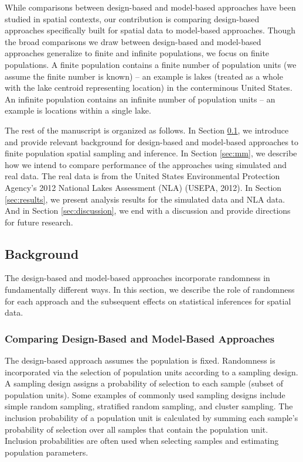 \documentclass[]{elsarticle} %
\begin{document}
While comparisons between design-based and model-based approaches have
been studied in spatial contexts, our contribution is comparing
design-based approaches specifically built for spatial data to
model-based approaches. Though the broad comparisons we draw between
design-based and model-based approaches generalize to finite and
infinite populations, we focus on finite populations. A finite
population contains a finite number of population units (we assume the
finite number is known) -- an example is lakes (treated as a whole with
the lake centroid representing location) in the conterminous United
States. An infinite population contains an infinite number of population
units -- an example is locations within a single lake.

The rest of the manuscript is organized as follows. In Section
\ref{sec:background}, we introduce and provide relevant background for
design-based and model-based approaches to finite population spatial
sampling and inference. In Section \ref{sec:mm}, we describe how we
intend to compare performance of the approaches using simulated and real
data. The real data is from the United States Environmental Protection
Agency's 2012 National Lakes Assessment (NLA) (USEPA, 2012). In Section
\ref{sec:results}, we present analysis results for the simulated data
and NLA data. And in Section \ref{sec:discussion}, we end with a
discussion and provide directions for future research.

\hypertarget{sec:background}{%
\subsection{Background}\label{sec:background}}

The design-based and model-based approaches incorporate randomness in
fundamentally different ways. In this section, we describe the role of
randomness for each approach and the subsequent effects on statistical
inferences for spatial data.

\hypertarget{subsec:dvm_compare}{%
\subsubsection{Comparing Design-Based and Model-Based
Approaches}\label{subsec:dvm_compare}}

The design-based approach assumes the population is fixed. Randomness is
incorporated via the selection of population units according to a
sampling design. A sampling design assigns a probability of selection to
each sample (subset of population units). Some examples of commonly used
sampling designs include simple random sampling, stratified random
sampling, and cluster sampling. The inclusion probability of a
population unit is calculated by summing each sample's probability of
selection over all samples that contain the population unit. Inclusion
probabilities are often used when selecting samples and estimating
population parameters.
\end{document}
